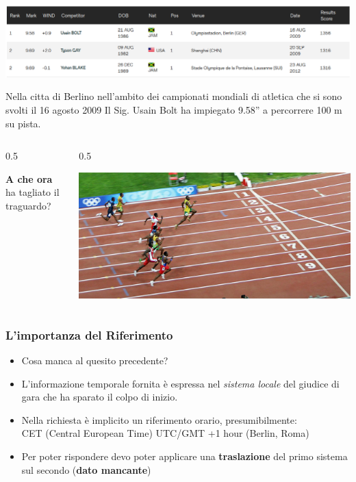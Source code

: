 \documentclass{beamer}
\begin{document}
{\begin{frame}
      \begin{center}
          \includegraphics[width=1\textwidth] {./pics_2022_03/record100m.png}	
      \end{center} 
      Nella citta di Berlino nell'ambito dei campionati mondiali di atletica
      che si sono svolti il 16 agosto 2009 Il Sig. Usain Bolt ha impiegato
      9.58'' a percorrere 100 m su pista.
      \begin{columns}	
         	\begin{column} {0.5\textwidth}
            \begin{center}
                \textbf{A che ora} ha tagliato il traguardo?
            \end{center}
   		\end{column}
      		\begin{column} {0.5\textwidth}
   		   \begin{center}
               \includegraphics[width=1\textwidth] {./pics_2022_03/Usain_Bolt_winning-cropped.jpg}	
           \end{center} 
   		\end{column}
   	\end{columns}

\end{frame}

\begin{frame}
   \frametitle{L'importanza del Riferimento}

   \begin{itemize}
   		\item Cosa manca al quesito precedente?
   		\item L'informazione temporale fornita è espressa nel \textit{sistema locale} 
        del giudice di gara che ha sparato il colpo di inizio.
   		\item Nella richiesta è implicito un riferimento orario, presumibilmente:\\
            CET (Central European Time) UTC/GMT +1 hour (Berlin, Roma)
        \item Per poter rispondere devo poter applicare una \textbf{traslazione} del primo
        sistema sul secondo (\textbf{dato mancante})
   \end{itemize}


\end{frame}}
\end{document}
